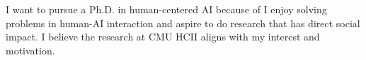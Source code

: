 




I want to pursue a Ph.D. in human-centered AI because of I enjoy solving problems in human-AI interaction and aspire to do research that has direct social impact. 
I believe the research at CMU HCII aligns with my interest and motivation.

